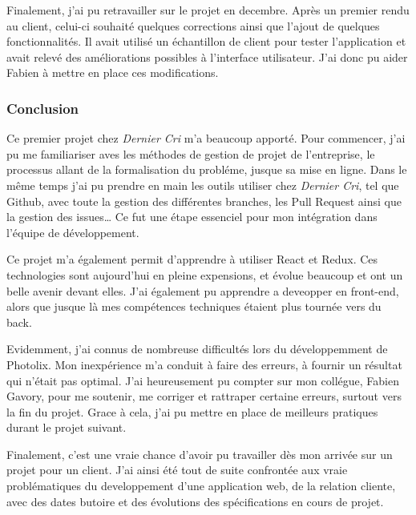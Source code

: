 \documentclass[12pt,a4paper]{article}
\begin{document}
  \bigskip

  Finalement, j'ai pu retravailler sur le projet en decembre. Après un
  premier rendu au client, celui-ci souhaité quelques corrections ainsi
  que l'ajout de quelques fonctionnalités. Il avait utilisé un échantillon
  de client pour tester l'application et avait relevé des améliorations
  possibles à l'interface utilisateur. J'ai donc pu aider Fabien à mettre
  en place ces modifications.

  \bigskip

  \subsubsection{Conclusion}\label{conclusion}

  \bigskip

  Ce premier projet chez \emph{Dernier Cri} m'a beaucoup apporté. Pour
  commencer, j'ai pu me familiariser aves les méthodes de gestion de
  projet de l'entreprise, le processus allant de la formalisation du
  probléme, jusque sa mise en ligne. Dans le même temps j'ai pu prendre en
  main les outils utiliser chez \emph{Dernier Cri}, tel que Github, avec
  toute la gestion des différentes branches, les Pull Request ainsi que la
  gestion des issues\ldots{} Ce fut une étape essenciel pour mon
  intégration dans l'équipe de développement.

  \bigskip

  Ce projet m'a également permit d'apprendre à utiliser React et Redux.
  Ces technologies sont aujourd'hui en pleine expensions, et évolue
  beaucoup et ont un belle avenir devant elles. J'ai également pu
  apprendre a deveopper en front-end, alors que jusque là mes compétences
  techniques étaient plus tournée vers du back.

  \bigskip

  Evidemment, j'ai connus de nombreuse difficultés lors du développemment
  de Photolix. Mon inexpérience m'a conduit à faire des erreurs, à fournir
  un résultat qui n'était pas optimal. J'ai heureusement pu compter sur
  mon collégue, Fabien Gavory, pour me soutenir, me corriger et rattraper
  certaine erreurs, surtout vers la fin du projet. Grace à cela, j'ai pu
  mettre en place de meilleurs pratiques durant le projet suivant.

  \bigskip

  Finalement, c'est une vraie chance d'avoir pu travailler dès mon arrivée
  sur un projet pour un client. J'ai ainsi été tout de suite confrontée
  aux vraie problématiques du developpement d'une application web, de la
  relation cliente, avec des dates butoire et des évolutions des
  spécifications en cours de projet.
\end{document}
